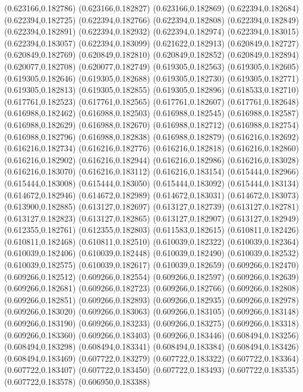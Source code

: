 (0.623166,0.182786)
(0.623166,0.182827)
(0.623166,0.182869)
(0.622394,0.182684)
(0.622394,0.182725)
(0.622394,0.182766)
(0.622394,0.182808)
(0.622394,0.182849)
(0.622394,0.182891)
(0.622394,0.182932)
(0.622394,0.182974)
(0.622394,0.183015)
(0.622394,0.183057)
(0.622394,0.183099)
(0.621622,0.182913)
(0.620849,0.182727)
(0.620849,0.182769)
(0.620849,0.182810)
(0.620849,0.182852)
(0.620849,0.182894)
(0.620077,0.182708)
(0.620077,0.182749)
(0.619305,0.182563)
(0.619305,0.182605)
(0.619305,0.182646)
(0.619305,0.182688)
(0.619305,0.182730)
(0.619305,0.182771)
(0.619305,0.182813)
(0.619305,0.182855)
(0.619305,0.182896)
(0.618533,0.182710)
(0.617761,0.182523)
(0.617761,0.182565)
(0.617761,0.182607)
(0.617761,0.182648)
(0.616988,0.182462)
(0.616988,0.182503)
(0.616988,0.182545)
(0.616988,0.182587)
(0.616988,0.182629)
(0.616988,0.182670)
(0.616988,0.182712)
(0.616988,0.182754)
(0.616988,0.182796)
(0.616988,0.182838)
(0.616988,0.182879)
(0.616216,0.182692)
(0.616216,0.182734)
(0.616216,0.182776)
(0.616216,0.182818)
(0.616216,0.182860)
(0.616216,0.182902)
(0.616216,0.182944)
(0.616216,0.182986)
(0.616216,0.183028)
(0.616216,0.183070)
(0.616216,0.183112)
(0.616216,0.183154)
(0.615444,0.182966)
(0.615444,0.183008)
(0.615444,0.183050)
(0.615444,0.183092)
(0.615444,0.183134)
(0.614672,0.182946)
(0.614672,0.182989)
(0.614672,0.183031)
(0.614672,0.183073)
(0.613900,0.182885)
(0.613127,0.182697)
(0.613127,0.182739)
(0.613127,0.182781)
(0.613127,0.182823)
(0.613127,0.182865)
(0.613127,0.182907)
(0.613127,0.182949)
(0.612355,0.182761)
(0.612355,0.182803)
(0.611583,0.182615)
(0.610811,0.182426)
(0.610811,0.182468)
(0.610811,0.182510)
(0.610039,0.182322)
(0.610039,0.182364)
(0.610039,0.182406)
(0.610039,0.182448)
(0.610039,0.182490)
(0.610039,0.182532)
(0.610039,0.182575)
(0.610039,0.182617)
(0.610039,0.182659)
(0.609266,0.182470)
(0.609266,0.182512)
(0.609266,0.182554)
(0.609266,0.182597)
(0.609266,0.182639)
(0.609266,0.182681)
(0.609266,0.182723)
(0.609266,0.182766)
(0.609266,0.182808)
(0.609266,0.182851)
(0.609266,0.182893)
(0.609266,0.182935)
(0.609266,0.182978)
(0.609266,0.183020)
(0.609266,0.183063)
(0.609266,0.183105)
(0.609266,0.183148)
(0.609266,0.183190)
(0.609266,0.183233)
(0.609266,0.183275)
(0.609266,0.183318)
(0.609266,0.183360)
(0.609266,0.183403)
(0.609266,0.183446)
(0.608494,0.183256)
(0.608494,0.183298)
(0.608494,0.183341)
(0.608494,0.183384)
(0.608494,0.183426)
(0.608494,0.183469)
(0.607722,0.183279)
(0.607722,0.183322)
(0.607722,0.183364)
(0.607722,0.183407)
(0.607722,0.183450)
(0.607722,0.183493)
(0.607722,0.183535)
(0.607722,0.183578)
(0.606950,0.183388)
